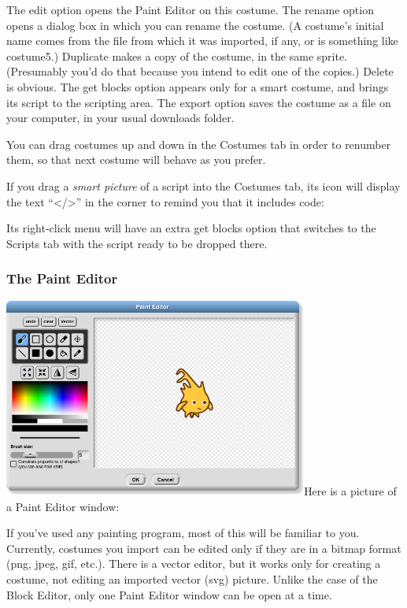 The edit option opens the Paint Editor on this costume. The rename
option opens a dialog box in which you can rename the costume. (A
costume's initial name comes from the file from which it was imported,
if any, or is something like costume5.) Duplicate makes a copy of the
costume, in the same sprite. (Presumably you'd do that because you
intend to edit one of the copies.) Delete is obvious. The get blocks
option appears only for a smart costume, and brings its script to the
scripting area. The export option saves the costume as a file on your
computer, in your usual downloads folder.

You can drag costumes up and down in the Costumes tab in order to
renumber them, so that next costume will behave as you prefer.

If you drag a \emph{smart picture} of a script into the Costumes tab,
its icon will display the text ``\textless/\textgreater'' in the corner
to remind you that it includes code:

Its right-click menu will have an extra get blocks option that switches
to the Scripts tab with the script ready to be dropped there.

\subsubsection{The Paint Editor}\label{the-paint-editor}

\includegraphics[width=3.93889in,height=2.57778in]{media/image1094.png}Here
is a picture of a Paint Editor window:

If you've used any painting program, most of this will be familiar to
you. Currently, costumes you import can be edited only if they are in a
bitmap format (png, jpeg, gif, etc.). There is a vector editor, but it
works only for creating a costume, not editing an imported vector (svg)
picture. Unlike the case of the Block Editor, only one Paint Editor
window can be open at a time.


